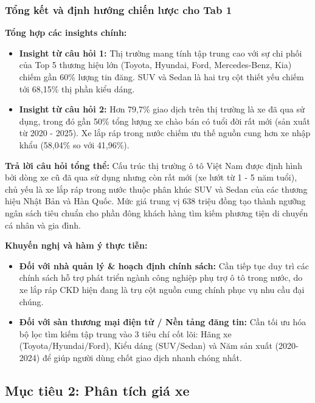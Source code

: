 \subsubsection{Tổng kết và định hướng chiến lược cho Tab 1}
\label{subsubsec:tab1_summary}

\noindent\textbf{Tổng hợp các insights chính:}
\begin{itemize}
    \item \textbf{Insight từ câu hỏi 1:} Thị trường mang tính tập trung cao với sự chi phối của Top 5 thương hiệu lớn (Toyota, Hyundai, Ford, Mercedes-Benz, Kia) chiếm gần 60\% lượng tin đăng. SUV và Sedan là hai trụ cột thiết yếu chiếm tới 68,15\% thị phần kiểu dáng.
    \item \textbf{Insight từ câu hỏi 2:} Hơn 79,7\% giao dịch trên thị trường là xe đã qua sử dụng, trong đó gần 50\% tổng lượng xe chào bán có tuổi đời rất mới (sản xuất từ 2020 - 2025). Xe lắp ráp trong nước chiếm ưu thế nguồn cung hơn xe nhập khẩu (58,04\% so với 41,96\%).
\end{itemize}

\noindent\textbf{Trả lời câu hỏi tổng thể:} 
Cấu trúc thị trường ô tô Việt Nam được định hình bởi dòng xe cũ đã qua sử dụng nhưng còn rất mới (xe lướt từ 1 - 5 năm tuổi), chủ yếu là xe lắp ráp trong nước thuộc phân khúc SUV và Sedan của các thương hiệu Nhật Bản và Hàn Quốc. Mức giá trung vị 638 triệu đồng tạo thành ngưỡng ngân sách tiêu chuẩn cho phần đông khách hàng tìm kiếm phương tiện di chuyển cá nhân và gia đình.

\noindent\textbf{Khuyến nghị và hàm ý thực tiễn:}
\begin{itemize}
    \item \textbf{Đối với nhà quản lý \& hoạch định chính sách:} Cần tiếp tục duy trì các chính sách hỗ trợ phát triển ngành công nghiệp phụ trợ ô tô trong nước, do xe lắp ráp CKD hiện đang là trụ cột nguồn cung chính phục vụ nhu cầu đại chúng.
    \item \textbf{Đối với sàn thương mại điện tử / Nền tảng đăng tin:} Cần tối ưu hóa bộ lọc tìm kiếm tập trung vào 3 tiêu chí cốt lõi: Hãng xe (Toyota/Hyundai/Ford), Kiểu dáng (SUV/Sedan) và Năm sản xuất (2020-2024) để giúp người dùng chốt giao dịch nhanh chóng nhất.
\end{itemize}

\subsection{Mục tiêu 2: Phân tích giá xe}
\label{subsec:tab[X]}



